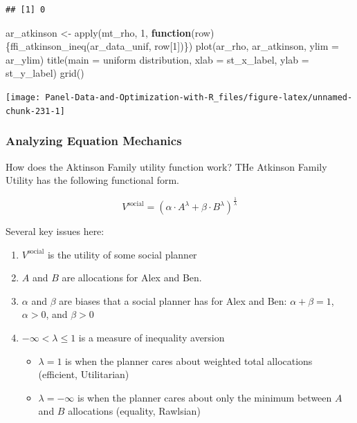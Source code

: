 \documentclass[
]{book}
\newenvironment{Shaded}{\begin{snugshade}}{\end{snugshade}}
\newcommand{\AttributeTok}[1]{\textcolor[rgb]{0.77,0.63,0.00}{#1}}
\newcommand{\ControlFlowTok}[1]{\textcolor[rgb]{0.13,0.29,0.53}{\textbf{#1}}}
\newcommand{\DecValTok}[1]{\textcolor[rgb]{0.00,0.00,0.81}{#1}}
\newcommand{\FunctionTok}[1]{\textcolor[rgb]{0.00,0.00,0.00}{#1}}
\newcommand{\NormalTok}[1]{#1}
\newcommand{\OtherTok}[1]{\textcolor[rgb]{0.56,0.35,0.01}{#1}}
\newcommand{\StringTok}[1]{\textcolor[rgb]{0.31,0.60,0.02}{#1}}
\providecommand{\tightlist}{%
  \setlength{\itemsep}{0pt}\setlength{\parskip}{0pt}}
\begin{document}
\begin{verbatim}
## [1] 0
\end{verbatim}

\begin{Shaded}
\begin{Highlighting}[]
\NormalTok{ar\_atkinson }\OtherTok{\textless{}{-}} \FunctionTok{apply}\NormalTok{(mt\_rho, }\DecValTok{1}\NormalTok{, }\ControlFlowTok{function}\NormalTok{(row)\{}\FunctionTok{ffi\_atkinson\_ineq}\NormalTok{(ar\_data\_unif, row[}\DecValTok{1}\NormalTok{])\})}
\FunctionTok{plot}\NormalTok{(ar\_rho, ar\_atkinson, }\AttributeTok{ylim =}\NormalTok{ ar\_ylim)}
\FunctionTok{title}\NormalTok{(}\AttributeTok{main =} \StringTok{\textquotesingle{}uniform distribution\textquotesingle{}}\NormalTok{, }\AttributeTok{xlab =}\NormalTok{ st\_x\_label, }\AttributeTok{ylab =}\NormalTok{ st\_y\_label)}
\FunctionTok{grid}\NormalTok{()}
\end{Highlighting}
\end{Shaded}

\begin{center}\texttt{[image: Panel-Data-and-Optimization-with-R\_files/figure-latex/unnamed-chunk-231-1]} \end{center}

\hypertarget{analyzing-equation-mechanics}{%
\subsubsection{Analyzing Equation Mechanics}\label{analyzing-equation-mechanics}}

How does the Aktinson Family utility function work? THe Atkinson Family Utility has the following functional form.

\[
V^{\text{social}}
=
\left(
\alpha
\cdot
A^{\lambda}
+
\beta
\cdot
B^{\lambda}
\right)^{\frac{1}{\lambda}}
\]

Several key issues here:

\begin{enumerate}
\def\labelenumi{\arabic{enumi}.}
\tightlist
\item
  \(V^{\text{social}}\) is the utility of some social planner
\item
  \(A\) and \(B\) are allocations for Alex and Ben.
\item
  \(\alpha\) and \(\beta\) are biases that a social planner has for Alex and Ben: \(\alpha+\beta=1\), \(\alpha>0\), and \(\beta>0\)
\item
  \(-\infty < \lambda \le 1\) is a measure of inequality aversion

  \begin{itemize}
  \tightlist
  \item
    \(\lambda=1\) is when the planner cares about weighted total allocations (efficient, Utilitarian)
  \item
    \(\lambda=-\infty\) is when the planner cares about only the minimum between \(A\) and \(B\) allocations (equality, Rawlsian)
  \end{itemize}
\end{enumerate}
\end{document}
